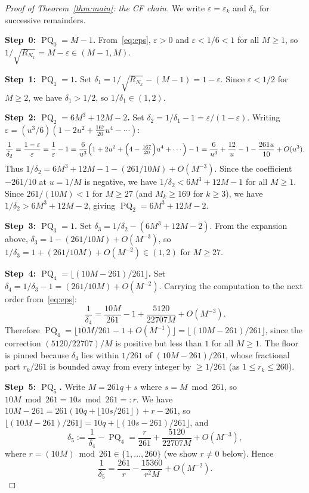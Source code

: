 \documentclass[12pt]{amsart}
\theoremstyle{definition}
\newcommand{\floor}[1]{\lfloor #1 \rfloor}
\DeclareMathOperator{\PQ}{PQ}
\begin{document}
\begin{proof}[Proof of Theorem~\ref{thm:main}: the CF chain]
  We write $\varepsilon = \varepsilon_k$ and $\delta_n$ for successive
  remainders.

  \medskip
  \noindent\textbf{Step~0: $\PQ_0 = M-1$.}
  From~\eqref{eq:eps}, $\varepsilon > 0$ and $\varepsilon < 1/6 < 1$
  for all $M \geq 1$, so $1/\sqrt{R_{N_k}} = M - \varepsilon \in (M-1, M)$.

  \medskip
  \noindent\textbf{Step~1: $\PQ_1 = 1$.}
  Set $\delta_1 = 1/\sqrt{R_{N_k}} - (M-1) = 1 - \varepsilon$.
  Since $\varepsilon < 1/2$ for $M \geq 2$, we have $\delta_1 > 1/2$,
  so $1/\delta_1 \in (1, 2)$.

  \medskip
  \noindent\textbf{Step~2: $\PQ_2 = 6M^3+12M-2$.}
  Set $\delta_2 = 1/\delta_1 - 1 = \varepsilon/(1-\varepsilon)$.
  Writing $\varepsilon = (u^3/6)(1 - 2u^2 + \frac{167}{20}u^4 - \cdots)$:
  \[
    \frac{1}{\delta_2} = \frac{1-\varepsilon}{\varepsilon}
    = \frac{1}{\varepsilon} - 1
    = \frac{6}{u^3}\!\left(1+2u^2+\Bigl(4-\tfrac{167}{20}\Bigr)u^4+\cdots\right) - 1
    = \frac{6}{u^3}+\frac{12}{u}-1-\frac{261u}{10}+O(u^3).
  \]
  Thus $1/\delta_2 = 6M^3+12M-1-(261/10M)+O(M^{-3})$.
  Since the coefficient $-261/10$ at $u = 1/M$ is negative, we have
  $1/\delta_2 < 6M^3+12M-1$ for all $M \geq 1$.
  Since $261/(10M) < 1$ for $M \geq 27$ (and $M_k \geq 169$ for $k \geq 3$),
  we have $1/\delta_2 > 6M^3+12M-2$, giving $\PQ_2 = 6M^3+12M-2$.

  \medskip
  \noindent\textbf{Step~3: $\PQ_3 = 1$.}
  Set $\delta_3 = 1/\delta_2 - (6M^3+12M-2)$.  From the expansion above,
  $\delta_3 = 1 - (261/10M) + O(M^{-3})$, so $1/\delta_3 = 1 + (261/10M)
  + O(M^{-2}) \in (1, 2)$ for $M \geq 27$.

  \medskip
  \noindent\textbf{Step~4: $\PQ_4 = \floor{(10M-261)/261}$.}
  Set $\delta_4 = 1/\delta_3 - 1 = (261/10M) + O(M^{-2})$.
  Carrying the computation to the next order from~\eqref{eq:eps}:
  \[
    \frac{1}{\delta_4}
    = \frac{10M}{261} - 1 + \frac{5120}{22707M} + O(M^{-3}).
  \]
  Therefore $\PQ_4 = \floor{10M/261 - 1 + O(M^{-1})} = \floor{(10M-261)/261}$,
  since the correction $(5120/22707)/M$ is positive but less than $1$ for all
  $M \geq 1$.  The floor is pinned because $\delta_4$ lies within $1/261$ of
  $(10M-261)/261$, whose fractional part $r_k/261$ is bounded away from every
  integer by $\ge 1/261$ (as $1 \le r_k \le 260$).

  \medskip
  \noindent\textbf{Step~5: $\PQ_5$.}\quad
  Write $M = 261q + s$ where $s = M \bmod 261$, so
  $10M \bmod 261 = 10s \bmod 261 =: r$.  We have
  $10M - 261 = 261(10q + \floor{10s/261}) + r - 261$, so
  $\floor{(10M-261)/261} = 10q + \floor{(10s-261)/261}$, and
  \[
    \delta_5
    := \frac{1}{\delta_4} - \PQ_4
    = \frac{r}{261} + \frac{5120}{22707M} + O(M^{-3}),
  \]
  where $r = (10M) \bmod 261 \in \{1,\ldots,260\}$ (we show $r \neq 0$
  below).  Hence
  \[
    \frac{1}{\delta_5}
    = \frac{261}{r} - \frac{15360}{r^2 M} + O(M^{-2}).
  \]


\end{proof}
\end{document}
